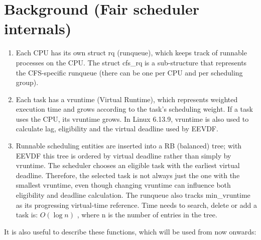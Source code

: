 \documentclass[11pt, a4paper]{article}
\begin{document}
\section{Background (Fair scheduler internals)}
    \begin{enumerate}
        \item   Each CPU has its own struct rq (runqueue), which keeps track of runnable processes on the CPU.
                The struct cfs\_rq is a sub-structure that represents the CFS-specific runqueue (there can be one per
                CPU and per scheduling group).
        
        \item   Each task has a vruntime (Virtual Runtime), which represents weighted execution time and grows according to the task's scheduling weight.
                If a task uses the CPU, its vruntime grows. In Linux 6.13.9, vruntime is also used to calculate lag, eligibility and the virtual deadline used by EEVDF.
        
        \item   Runnable scheduling entities are inserted into a RB (balanced) tree; with EEVDF this tree is ordered by virtual deadline rather than simply by vruntime.
                The scheduler chooses an eligible task with the earliest virtual deadline. Therefore, the selected task is not always just the one with the smallest vruntime, even though changing vruntime can influence both eligibility and deadline calculation.
                The runqueue also tracks min\_vruntime as its progressing virtual-time reference.
                Time needs to search, delete or add a task is: $O(\log n)$ , where n is the number of entries in the
                tree.
    \end{enumerate}
    It is also useful to describe these functions, which will be used from now onwards:
\end{document}
